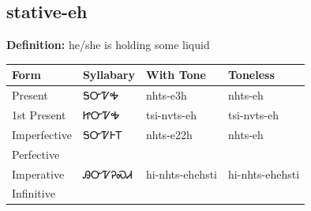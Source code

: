 \documentclass{article}%
\begin{document}
\subsection*{stative-eh}%
\textbf{Definition: }%
he/she is holding some liquid%
\\[0.5em]%
\begin{tabular}{|l|l|l|l|}%
\hline%
\textbf{Form}&\textbf{Syllabary}&\textbf{With Tone}&\textbf{Toneless}\\%
\hline%
Present&ᎦᏅᏤᎭ&nhts{-}e3h&nhts{-}eh\\%
1st Present&ᏥᏅᏤᎭ&tsi{-}nvts{-}eh&tsi{-}nvts{-}eh\\%
Imperfective&ᎦᏅᏤᎰᎢ&nhts{-}e22h&nhts{-}eh\\%
Perfective&&&\\%
Imperative&ᎯᏅᏤᎮᏍᏗ&hi{-}nhts{-}ehehsti&hi{-}nhts{-}ehehsti\\%
Infinitive&&&\\%
\hline%
\end{tabular}%
\\[1em]%
\end{document}
